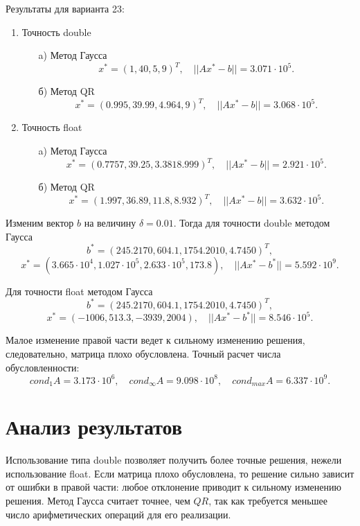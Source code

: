 \documentclass[12pt, a4paper]{article}
\begin{document}
Результаты для варианта 23:
\begin{enumerate}
\item Точность double
	\begin{enumerate}
	\item[a)] Метод Гаусса
	$$x^* = (1 , 40, 5 ,9)^{T},\quad ||Ax^{*}-b|| = 3{.}071\cdot10^5.$$
	\item[б)] Метод QR
	$$x^* = (0{.}995 , 39{.}99, 4{.}964 ,9)^{T},\quad ||Ax^{*}-b|| = 3{.}068\cdot10^5.$$
	\end{enumerate}
\item Точность float
	\begin{enumerate}
	\item[a)] Метод Гаусса
	$$x^* = (0{.}7757 , 39{.}25, 3{.}381 8{.}999)^{T},\quad ||Ax^{*}-b|| = 2{.}921\cdot10^5.$$
	\item[б)] Метод QR
	$$x^* = (1{.}997 , 36{.}89, 11{.}8 ,8{.}932)^{T},\quad ||Ax^{*}-b|| = 3{.}632\cdot10^5.$$
	\end{enumerate}
\end{enumerate}
Изменим вектор $b$ на величину $\delta = 0.01$. Тогда для точности double методом Гаусса
$$b^* = (245.2170, 604{.}1, 1754{.}2010, 4{.}7450)^T,$$
$$x^* = (3{.}665\cdot10^4, 1{.}027\cdot10^5, 2{.}633\cdot10^5, 173{.}8), \quad ||Ax^{*}-b^*|| =  5{.}592\cdot10^9.$$

Для точности float методом Гаусса
$$b^* = (245.2170, 604{.}1, 1754{.}2010, 4{.}7450)^T,$$
$$x^* = (-1006, 513{.}3, -3939, 2004), \quad ||Ax^{*}-b^*|| =  8{.}546\cdot10^5.$$

Малое изменение правой части ведет к сильному изменению решения, следовательно, матрица плохо обусловлена. Точный расчет числа обусловленности: 
$$cond_1A = 3{.}173\cdot10^6,\quad cond_{\infty}A = 9{.}098\cdot10^8, \quad cond_{max}A = 6{.}337\cdot10^9 .$$
\newpage

\section{Анализ результатов}
Использование типа double позволяет получить более точные решения,
нежели использование float. Если матрица плохо обусловлена, то решение сильно зависит от ошибки в правой части: любое отклонение приводит к сильному изменению решения. Метод Гаусса считает точнее, чем $QR$, так как требуется меньшее число арифметических операций для его реализации.

\newpage
\end{document}
